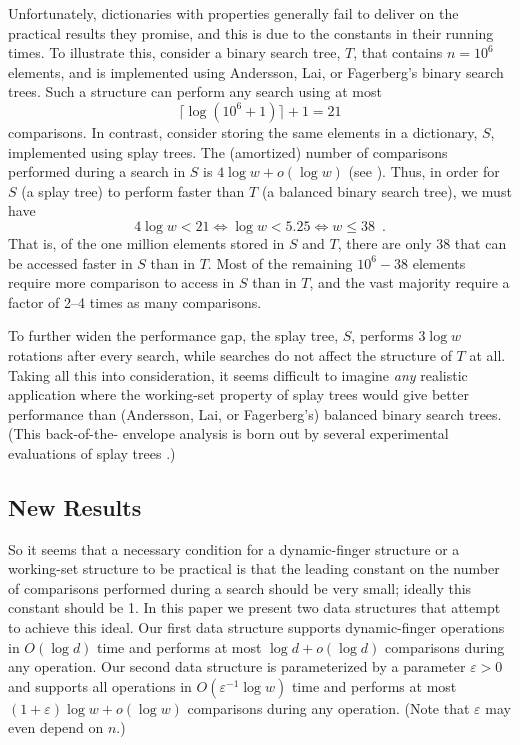 \documentclass{patmorin}
\newcommand{\eps}{\varepsilon}
\begin{document}
Unfortunately, dictionaries with properties generally fail to deliver on
the practical results they promise, and this is due to the constants in
their running times.  To illustrate this, consider a binary search tree,
$T$, that contains $n=10^6$ elements, and is implemented using Andersson,
Lai, or Fagerberg's binary search trees.  Such a structure can perform
any search using at most
\[
   \lceil\log(10^6+1)\rceil+1= 21
\]
comparisons.  In contrast, consider storing the same elements in a
dictionary, $S$, implemented using splay trees.  The (amortized) number
of comparisons performed during a search in $S$ is $4\log w+o(\log w)$
(see ).  Thus, in order for $S$ (a splay tree)
to perform faster than $T$ (a balanced binary search tree), we must have
\[
   4\log w < 21 
       \Leftrightarrow \log w < 5.25 
       \Leftrightarrow w \le 38 \enspace .
\]
That is, of the one million elements stored in $S$ and $T$, there are only
38 that can be accessed faster in $S$ than in $T$.  Most of the remaining
$10^6 - 38$ elements require more comparison to access in $S$ than in $T$,
and the vast majority require a factor of 2--4 times as many comparisons.

To further widen the performance gap, the splay tree, $S$, performs
$3\log w$ rotations after every search, while searches do not affect
the structure of $T$ at all.  Taking all this into consideration,
it seems difficult to imagine \emph{any} realistic application where
the working-set property of splay trees would give better performance
than (Andersson, Lai, or Fagerberg's) balanced binary search trees.
(This back-of-the- envelope analysis is born out by several experimental
evaluations of splay trees \cite{X,X,X}.)

\subsection{New Results}

So it seems that a necessary condition for a dynamic-finger structure
or a working-set structure to be practical is that the leading constant
on the number of comparisons performed during a search should be very
small; ideally this constant should be 1.  In this paper we present two
data structures that attempt to achieve this ideal.  Our first data
structure supports dynamic-finger operations in $O(\log d)$ time and
performs at most $\log d+o(\log d)$ comparisons during any operation. Our
second data structure is parameterized by a parameter $\eps >0$ and
supports all operations in $O(\eps^{-1}\log w)$ time and performs
at most $(1+\eps)\log w+o(\log w)$ comparisons during any operation.
(Note that $\eps$ may even depend on $n$.)
\end{document}
